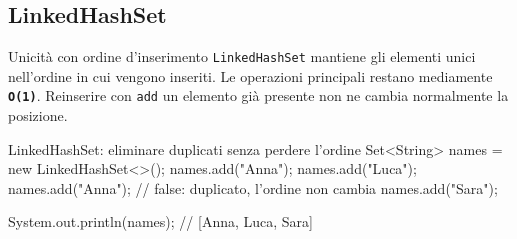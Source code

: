 ﻿\documentclass[10pt,a4paper]{article}
\newcommand{\cmd}[1]{\texttt{#1}}
\newcommand{\complexity}[1]{\textcolor{accent}{\texttt{\textbf{#1}}}}
\newcommand{\topicsubsection}[1]{\Needspace{10\baselineskip}\subsection{#1}}
\newenvironment{topicblock}{%
  \par\medskip\noindent\begin{minipage}{\textwidth}%
}{%
  \end{minipage}\par\medskip%
}
\begin{document}
\begin{topicblock}
\topicsubsection{LinkedHashSet}
\begin{difference}{Unicità con ordine d'inserimento}
\cmd{LinkedHashSet} mantiene gli elementi unici nell'ordine in cui vengono
inseriti. Le operazioni principali restano mediamente
\complexity{O(1)}. Reinserire con \cmd{add} un elemento già presente non ne
cambia normalmente la posizione.
\end{difference}

\begin{codebox}{LinkedHashSet: eliminare duplicati senza perdere l'ordine}
Set<String> names = new LinkedHashSet<>();
names.add("Anna");
names.add("Luca");
names.add("Anna"); // false: duplicato, l'ordine non cambia
names.add("Sara");

System.out.println(names); // [Anna, Luca, Sara]
\end{codebox}
\end{topicblock}
\end{document}
